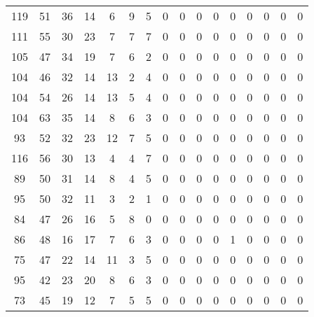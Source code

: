 \begin{tabular}{S S S S S S S S S S S S S S S S}
        119 &  51 &  36 &  14 &   6 &   9 &   5 &   0 &   0 &   0 &   0 &   0 &   0 &   0 &   0 &   0 \\
        111 &  55 &  30 &  23 &   7 &   7 &   7 &   0 &   0 &   0 &   0 &   0 &   0 &   0 &   0 &   0 \\
        105 &  47 &  34 &  19 &   7 &   6 &   2 &   0 &   0 &   0 &   0 &   0 &   0 &   0 &   0 &   0 \\
        104 &  46 &  32 &  14 &  13 &   2 &   4 &   0 &   0 &   0 &   0 &   0 &   0 &   0 &   0 &   0 \\
        104 &  54 &  26 &  14 &  13 &   5 &   4 &   0 &   0 &   0 &   0 &   0 &   0 &   0 &   0 &   0 \\
        104 &  63 &  35 &  14 &   8 &   6 &   3 &   0 &   0 &   0 &   0 &   0 &   0 &   0 &   0 &   0 \\
         93 &  52 &  32 &  23 &  12 &   7 &   5 &   0 &   0 &   0 &   0 &   0 &   0 &   0 &   0 &   0 \\
        116 &  56 &  30 &  13 &   4 &   4 &   7 &   0 &   0 &   0 &   0 &   0 &   0 &   0 &   0 &   0 \\
         89 &  50 &  31 &  14 &   8 &   4 &   5 &   0 &   0 &   0 &   0 &   0 &   0 &   0 &   0 &   0 \\
         95 &  50 &  32 &  11 &   3 &   2 &   1 &   0 &   0 &   0 &   0 &   0 &   0 &   0 &   0 &   0 \\
         84 &  47 &  26 &  16 &   5 &   8 &   0 &   0 &   0 &   0 &   0 &   0 &   0 &   0 &   0 &   0 \\
         86 &  48 &  16 &  17 &   7 &   6 &   3 &   0 &   0 &   0 &   0 &   1 &   0 &   0 &   0 &   0 \\
         75 &  47 &  22 &  14 &  11 &   3 &   5 &   0 &   0 &   0 &   0 &   0 &   0 &   0 &   0 &   0 \\
         95 &  42 &  23 &  20 &   8 &   6 &   3 &   0 &   0 &   0 &   0 &   0 &   0 &   0 &   0 &   0 \\
         73 &  45 &  19 &  12 &   7 &   5 &   5 &   0 &   0 &   0 &   0 &   0 &   0 &   0 &   0 &   0 \\
        \bottomrule
    \end{tabular}
